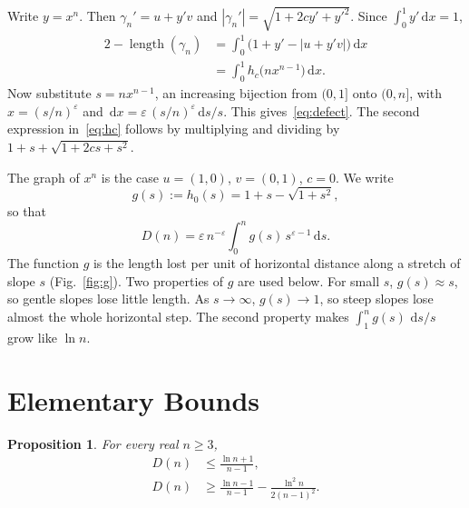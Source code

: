 \documentclass[journal]{IEEEtran}
\newtheorem{proposition}{Proposition}
\newcommand{\eps}{\varepsilon}
\newcommand{\dd}{\,\mathrm{d}}
\begin{document}
\begin{IEEEproof}
Write $y=x^n$. Then $\gamma_n'=u+y'v$ and $|\gamma_n'|=\sqrt{1+2cy'+y'^2}$. Since
$\int_0^1y'\dd x=1$,
\begin{align*}
  2-\operatorname{length}(\gamma_n)&=\int_0^1\bigl(1+y'-|u+y'v|\bigr)\dd x\\
  &=\int_0^1h_c\bigl(nx^{n-1}\bigr)\dd x.
\end{align*}
Now substitute $s=nx^{n-1}$, an increasing bijection from $(0,1]$ onto $(0,n]$, with
$x=(s/n)^{\eps}$ and $\dd x=\eps\,(s/n)^{\eps}\dd s/s$. This gives~\eqref{eq:defect}. The
second expression in~\eqref{eq:hc} follows by multiplying and dividing by
$1+s+\sqrt{1+2cs+s^2}$.
\end{IEEEproof}

The graph of $x^n$ is the case $u=(1,0)$, $v=(0,1)$, $c=0$. We write
\begin{equation}\label{eq:g}
  g(s):=h_0(s)=1+s-\sqrt{1+s^2},
\end{equation}
so that
\begin{equation}\label{eq:D}
  D(n)=\eps\,n^{-\eps}\int_0^n g(s)\,s^{\eps-1}\dd s.
\end{equation}
The function $g$ is the length lost per unit of horizontal distance along a stretch of slope
$s$ (Fig.~\ref{fig:g}). Two properties of $g$ are used below. For small $s$,
$g(s)\approx s$, so gentle slopes lose little length. As $s\to\infty$, $g(s)\to1$, so steep
slopes lose almost the whole horizontal step. The second property makes
$\int_1^n g(s)\,\dd s/s$ grow like $\ln n$.

\section{Elementary Bounds}\label{sec:elementary}

\begin{proposition}\label{prop:elementary}
For every real $n\ge3$,
\begin{align*}
  D(n)&\le\frac{\ln n+1}{n-1},\\
  D(n)&\ge\frac{\ln n-1}{n-1}-\frac{\ln^2n}{2(n-1)^2}.
\end{align*}
\end{proposition}
\end{document}
